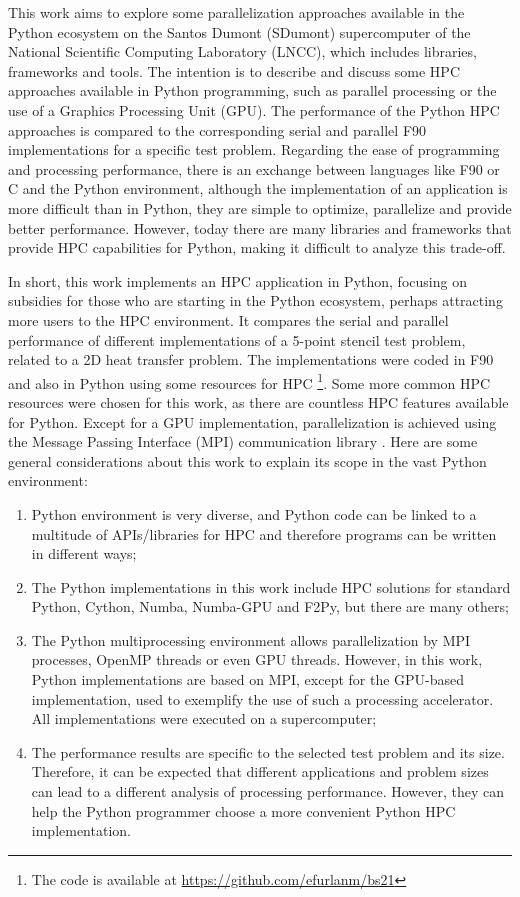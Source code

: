\documentclass[12pt]{article}
\begin{document}
This work aims to explore some parallelization approaches available in the Python ecosystem on the Santos Dumont (SDumont) supercomputer of the National Scientific Computing Laboratory (LNCC), which includes libraries, frameworks and tools. The intention is to describe and discuss some HPC approaches available in Python programming, such as parallel processing or the use of a Graphics Processing Unit (GPU). The performance of the Python HPC approaches is compared to the corresponding serial and parallel F90 implementations for a specific test problem. Regarding the ease of programming and processing performance, there is an exchange between languages like F90 or C and the Python environment, although the implementation of an application is more difficult than in Python, they are simple to optimize, parallelize and provide better performance. However, today there are many libraries and frameworks that provide HPC capabilities for Python, making it difficult to analyze this trade-off.

In short, this work implements an HPC application in Python, focusing on subsidies for those who are starting in the Python ecosystem, perhaps attracting more users to the HPC environment. It compares the serial and parallel performance of different implementations of a 5-point stencil test problem, related to a 2D heat transfer problem.
The implementations were coded in F90 and also in Python using some resources for HPC \footnote{The code is available at \href{https://github.com/efurlanm/bs21}{https://github.com/efurlanm/bs21}}. 
Some more common HPC resources were chosen for this work, as there are countless HPC features available for Python.
Except for a GPU implementation, parallelization is achieved using the Message Passing Interface (MPI) communication library \cite{MPI-std}. Here are some general considerations about this work to explain its scope in the vast Python environment:

\begin{enumerate}
    \item
    Python environment is very diverse, and Python code can be linked to a multitude of APIs/libraries for HPC and therefore programs can be written in different ways;
    \item 
    The Python implementations in this work include HPC solutions for standard Python, Cython, Numba, Numba-GPU and F2Py, but there are many others;
    \item 
    The Python multiprocessing environment allows parallelization by MPI processes, OpenMP threads or even GPU threads. However, in this work, Python implementations are based on MPI, except for the GPU-based implementation, used to exemplify the use of such a processing accelerator. All implementations were executed on a supercomputer;
    \item 
    The performance results are specific to the selected test problem and its size. Therefore, it can be expected that different applications and problem sizes can lead to a different analysis of processing performance. However, they can help the Python programmer choose a more convenient Python HPC implementation. 
\end{enumerate}
\end{document}
